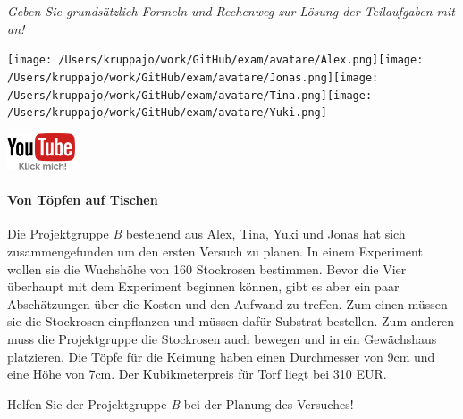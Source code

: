 \documentclass[a4paper, 9pt]{scrartcl}\usepackage[]{graphicx}\usepackage[]{xcolor}
\begin{document}
\textit{Geben Sie grundsätzlich Formeln und Rechenweg zur Lösung der Teilaufgaben mit an!} \\[1Ex]
 

 
\begin{minipage}[t]{0.5\textwidth}
\texttt{[image: /Users/kruppajo/work/GitHub/exam/avatare/Alex.png]}\hspace{-4mm}\texttt{[image: /Users/kruppajo/work/GitHub/exam/avatare/Jonas.png]}\hspace{-4mm}\texttt{[image: /Users/kruppajo/work/GitHub/exam/avatare/Tina.png]}\hspace{-4mm}\texttt{[image: /Users/kruppajo/work/GitHub/exam/avatare/Yuki.png]}
\end{minipage}
\begin{minipage}[t]{0.5\textwidth}
\hfill
\href{https://youtu.be/57B-yYoFSk0}{\includegraphics[width = 2cm]{img/youtube}}
\end{minipage}




\paragraph{Von Töpfen auf Tischen}



Die Projektgruppe \textit{B} bestehend aus Alex, Tina, Yuki und Jonas hat sich zusammengefunden um den ersten Versuch zu planen. In einem Experiment wollen sie die Wuchshöhe von 160 Stockrosen bestimmen. Bevor die Vier überhaupt mit dem Experiment beginnen können, gibt es aber ein paar Abschätzungen über die Kosten und den Aufwand zu treffen. Zum einen müssen sie die Stockrosen einpflanzen und müssen dafür Substrat bestellen. Zum anderen muss die Projektgruppe die Stockrosen auch bewegen und in ein Gewächshaus platzieren. Die Töpfe für die Keimung haben
einen Durchmesser von 9cm und eine Höhe von 7cm. Der Kubikmeterpreis für Torf liegt bei 310 EUR.

\vspace{1Ex}

Helfen Sie der Projektgruppe \textit{B} bei der Planung des Versuches!
\end{document}
